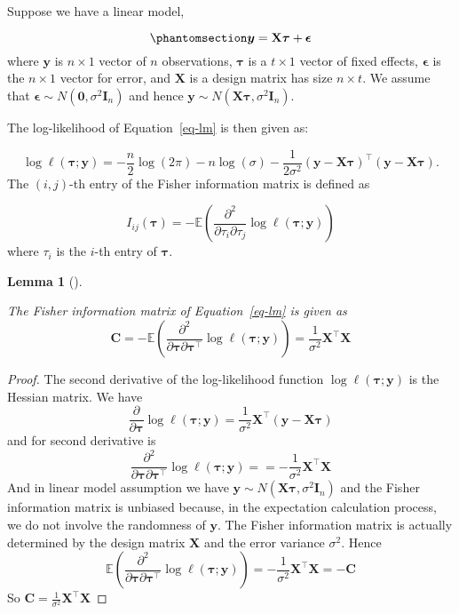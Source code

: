 \documentclass[
  a4paper,
  oneside,
  openany,
  12pt,
  onecolumn]{book}
\theoremstyle{plain}
\newtheorem{lemma}{Lemma}[chapter]
\theoremstyle{definition}
\theoremstyle{remark}
\begin{document}
Suppose we have a linear model,

\begin{equation}\phantomsection\label{eq-lm}{\boldsymbol{y}=\mathbf{X}\boldsymbol{\tau} + \boldsymbol{\epsilon}}\end{equation}
where \(\boldsymbol{y}\) is \(n\times 1\) vector of \(n\) observations,
\(\boldsymbol{\tau}\) is a \(t\times 1\) vector of fixed effects,
\(\boldsymbol{\epsilon}\) is the \(n\times 1\) vector for error, and
\(\mathbf{X}\) is a design matrix has size \(n\times t\). We assume that
\(\boldsymbol{\epsilon} \sim N(\boldsymbol{0}, \sigma^2\boldsymbol{I}_{n})\)
and hence
\(\boldsymbol{y} \sim N(\mathbf{X}\boldsymbol{\tau}, \sigma^2\mathbf{I}_n)\).

The log-likelihood of Equation~\ref{eq-lm} is then given as:

\[
\log\ell(\boldsymbol{\tau};\boldsymbol{y}) = -\frac{n}{2}\log(2\pi)-n\log(\sigma)-\frac{1}{2\sigma^2}(\boldsymbol{y}-\boldsymbol{X}\boldsymbol{\tau})^\top(\boldsymbol{y}-\boldsymbol{X}\boldsymbol{\tau}).
\] The \((i,j)\)-th entry of the Fisher information matrix is defined as

\[
I_{ij}(\boldsymbol{\tau})=-\mathbb{E}\left(\frac{\partial^2}{\partial\tau_i\partial\tau_j}\log\ell(\boldsymbol{\tau};\boldsymbol{y})\right)
\] where \(\tau_i\) is the \(i\)-th entry of \(\boldsymbol{\tau}\).

\begin{lemma}[]\protect\hypertarget{lem-fim-lm}{}\label{lem-fim-lm}

The Fisher information matrix of Equation~\ref{eq-lm} is given as \[
\mathbf{C} = -\mathbb{E}\left(\frac{\partial^2}{\partial\boldsymbol{\tau}\partial\boldsymbol{\tau}^\top}\log\ell(\boldsymbol{\tau};\boldsymbol{y})\right)=\frac{1}{\sigma^2}\boldsymbol{X}^\top\boldsymbol{X}
\]

\end{lemma}

\begin{proof}
The second derivative of the log-likelihood function
\(\log\ell(\boldsymbol{\tau};\boldsymbol{y})\) is the Hessian matrix. We
have \[
\frac{\partial}{\partial\boldsymbol{\tau}}\log\ell(\boldsymbol{\tau};\boldsymbol{y})=\frac{1}{\sigma^2}\boldsymbol{X}^\top(\boldsymbol{y}-\boldsymbol{X}\boldsymbol{\tau})
\] and for second derivative is \[
\frac{\partial^2}{\partial\boldsymbol{\tau}\partial\boldsymbol{\tau}^\top}\log\ell(\boldsymbol{\tau};\boldsymbol{y})==-\frac{1}{\sigma^2}\boldsymbol{X}^\top\boldsymbol{X}
\] And in linear model assumption we have
\(\boldsymbol{y} \sim N(\mathbf{X}\boldsymbol{\tau}, \sigma^2\mathbf{I}_n)\)
and the Fisher information matrix is unbiased because, in the
expectation calculation process, we do not involve the randomness of
\(\boldsymbol{y}\). The Fisher information matrix is actually determined
by the design matrix \(\boldsymbol{X}\) and the error variance
\(\sigma^2\). Hence \[
\mathbb{E}\left(\frac{\partial^2}{\partial\boldsymbol{\tau}\partial\boldsymbol{\tau}^\top}\log\ell(\boldsymbol{\tau};\boldsymbol{y})\right)=-\frac{1}{\sigma^2}\boldsymbol{X}^\top\boldsymbol{X} = -\mathbf{C} 
\] So
\(\mathbf{C} = \frac{1}{\sigma^2}\boldsymbol{X}^\top\boldsymbol{X}\)
\end{proof}
\end{document}
